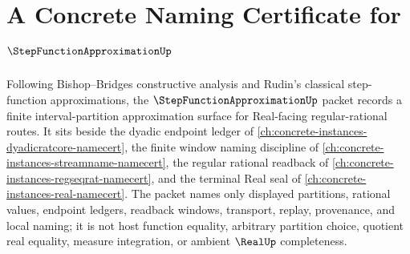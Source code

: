 \chapter{A Concrete Naming Certificate for $\StepFunctionApproximationUp$}
\label{ch:concrete-instances-step-function-approximation-namecert}

Following Bishop--Bridges constructive analysis and Rudin's classical step-function approximations, the $\StepFunctionApproximationUp$ packet records a finite interval-partition approximation surface for Real-facing regular-rational routes. It sits beside the dyadic endpoint ledger of \autoref{ch:concrete-instances-dyadicratcore-namecert}, the finite window naming discipline of \autoref{ch:concrete-instances-streamname-namecert}, the regular rational readback of \autoref{ch:concrete-instances-regseqrat-namecert}, and the terminal Real seal of \autoref{ch:concrete-instances-real-namecert}. The packet names only displayed partitions, rational values, endpoint ledgers, readback windows, transport, replay, provenance, and local naming; it is not host function equality, arbitrary partition choice, quotient real equality, measure integration, or ambient $\RealUp$ completeness.

